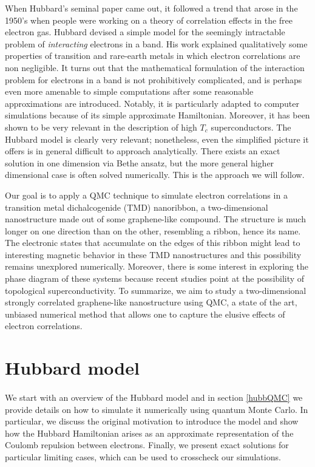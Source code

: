 \documentclass[10pt, twocolumn, twoside]{article}
\begin{document}
When Hubbard's seminal paper came out, it followed a trend that arose in the 1950's when people were working on a theory of correlation effects in the free electron gas. Hubbard devised a simple model for the seemingly intractable problem of \emph{interacting} electrons in a band. His work explained qualitatively some properties of transition and rare-earth metals in which electron correlations are non negligible. It turns out that the mathematical formulation of the interaction problem for electrons in a band is not prohibitively complicated, and is perhaps even more amenable to simple computations after some reasonable approximations are introduced. Notably, it is particularly adapted to computer simulations because of its simple approximate Hamiltonian. Moreover, it has been shown to be very relevant in the description of high $T_c$ superconductors. The Hubbard model is clearly very relevant; nonetheless, even the simplified picture it offers is in general difficult to approach analytically. There exists an exact solution in one dimension via Bethe ansatz, but the more general higher dimensional case is often solved numerically. This is the approach we will follow.

Our goal is to apply a QMC technique to simulate electron correlations in a transition metal dichalcogenide (TMD) nanoribbon, a two-dimensional nanostructure made out of some graphene-like compound. The structure is much longer on one direction than on the other, resembling a ribbon, hence its name. The electronic states that accumulate on the edges of this ribbon might lead to interesting magnetic behavior in these TMD nanostructures and this possibility remains unexplored numerically. Moreover, there is some interest in exploring the phase diagram of these systems because recent studies point at the possibility of topological superconductivity. To summarize, we aim to study a two-dimensional strongly correlated graphene-like nanostructure using QMC, a state of the art, unbiased numerical method that allows one to capture the elusive effects of electron correlations.

\section{Hubbard model}\paragraph{}

We start with an overview of the Hubbard model and in section \ref{hubbQMC} we provide details on how to simulate it numerically using quantum Monte Carlo. In particular, we discuss the original motivation to introduce the model and show how the Hubbard Hamiltonian arises as an approximate representation of the Coulomb repulsion between electrons. Finally, we present exact solutions for particular limiting cases, which can be used to crosscheck our simulations.
\end{document}
